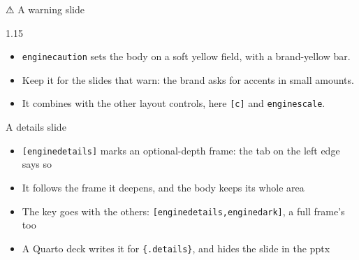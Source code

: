 \documentclass[aspectratio=\engineaspectratio]{beamer}
\begin{document}
\begin{frame}[c]{⚠︎ A warning slide}
  \enginefootnotespring
  \begin{enginescale}{1.15}
    \begin{enginecaution}
      \begin{itemize}
      \item \texttt{enginecaution} sets the body on a soft yellow field, with a brand-yellow bar.
      \item Keep it for the slides that warn: the brand asks for accents in small amounts.
      \item It combines with the other layout controls, here \texttt{[c]} and \texttt{enginescale}.
      \end{itemize}
    \end{enginecaution}
  \end{enginescale}
  \enginefootnotespring
  \begin{enginefootnotes}
  \end{enginefootnotes}
\end{frame}

\begin{frame}[enginedetails]{A details slide}
  \begin{itemize}
  \item \texttt{[enginedetails]} marks an optional-depth frame: the tab on the left edge says so
  \item It follows the frame it deepens, and the body keeps its whole area
  \item The key goes with the others: \texttt{[enginedetails,enginedark]}, a full frame's too
  \item A Quarto deck writes it for \texttt{\{.details\}}, and hides the slide in the pptx
  \end{itemize}
\end{frame}
\end{document}
